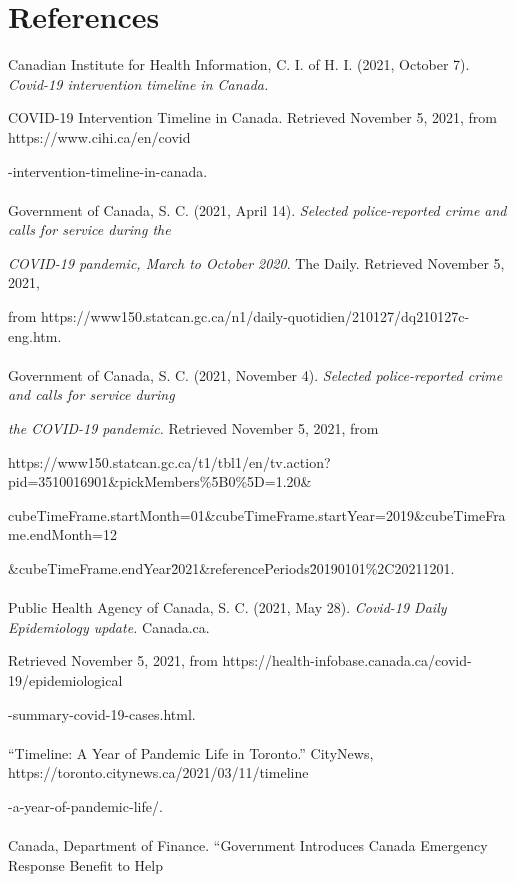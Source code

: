 \documentclass[fontsize=11pt]{article}
\begin{document}
\section*{References}

Canadian Institute for Health Information, C. I. of H. I. (2021, October 7). \emph{Covid-19 intervention timeline in Canada.}

\qquad COVID-19 Intervention Timeline in Canada. Retrieved November 5, 2021, from https://www.cihi.ca/en/covid

-intervention-timeline-in-canada.
\\\\Government of Canada, S. C. (2021, April 14). \emph{Selected police-reported crime and calls for service during the}

\qquad\emph{COVID-19 pandemic, March to October 2020}. The Daily. Retrieved November 5, 2021, 

\qquad from https://www150.statcan.gc.ca/n1/daily-quotidien/210127/dq210127c-eng.htm.
\\\\Government of Canada, S. C. (2021, November 4). \emph{Selected police-reported crime and calls for service during}

\qquad \emph{the COVID-19 pandemic.} Retrieved November 5, 2021, from 

\qquad https://www150.statcan.gc.ca/t1/tbl1/en/tv.action?pid=3510016901\&pickMembers\%5B0\%5D=1.20\&

\qquad cubeTimeFrame.startMonth=01\&cubeTimeFrame.startYear=2019\&cubeTimeFrame.endMonth=12

\qquad \&cubeTimeFrame.endYear\=2021\&referencePeriods\=20190101\%2C20211201. 
\\\\Public Health Agency of Canada, S. C. (2021, May 28). \emph{Covid-19 Daily Epidemiology update.} Canada.ca. 

\qquad Retrieved November 5, 2021, from https://health-infobase.canada.ca/covid-19/epidemiological

\qquad -summary-covid-19-cases.html. 
\\\\“Timeline: A Year of Pandemic Life in Toronto.” CityNews, https://toronto.citynews.ca/2021/03/11/timeline

\qquad -a-year-of-pandemic-life/. 
\\\\Canada, Department of Finance. “Government Introduces Canada Emergency Response Benefit to Help 
\end{document}

